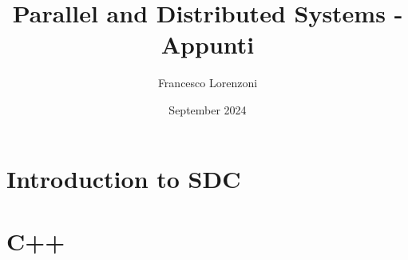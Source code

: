 

\usepackage{lstfiracode}
\lstset{
   language=C++
   }
   
   \title{Parallel and Distributed Systems - Appunti}
   \author{Francesco Lorenzoni}
   \date{September 2024}
   
   
   \makeatletter
   \renewcommand{\l@section}{\@dottedtocline{1}{1.5em}{2.6em}}
   \renewcommand{\l@subsection}{\@dottedtocline{2}{2.5em}{3.6em}}
   \renewcommand{\l@subsubsection}{\@dottedtocline{3}{3.5em}{4.5em}}
   \makeatother
   
   

\doparttoc[n]

\maketitle
\tableofcontents

\part{Introduction to SDC}
\parttoc







\part{C++}
\parttoc





